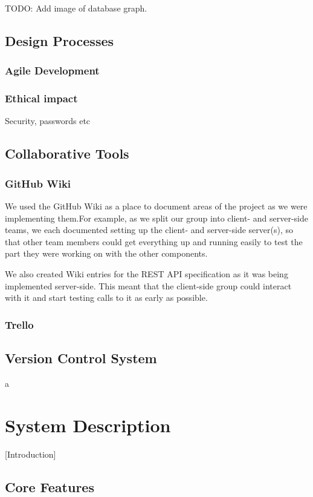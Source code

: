 \documentclass[11pt]{article}
\begin{document}
{TODO: Add image of database graph.
\subsection {Design Processes}

\subsubsection {Agile Development}
\subsubsection {Ethical impact}
	Security, passwords etc

\subsection {Collaborative Tools}
\subsubsection {GitHub Wiki}
We used the GitHub Wiki as a place to document areas of the project as we were implementing them.For example, as we split our group into client- and server-side teams, we each documented setting up the client- and server-side server(s), so that other team members could get everything up and running easily to test the part they were working on with the other components.

We also created Wiki entries for the REST API specification as it was being implemented server-side. This meant that the client-side group could interact with it and start testing calls to it as early as possible.
\subsubsection {Trello}

\subsection {Version Control System}
a
\section {System Description}

[Introduction]

\subsection {Core Features}

}
\end{document}
